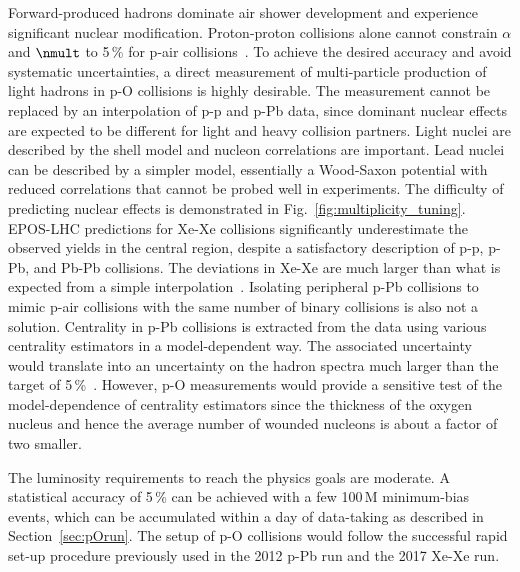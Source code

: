 \documentclass[../report.tex]{subfiles}
\begin{document}
Forward-produced hadrons dominate air shower development and experience significant nuclear modification\cite{Aaij:2017cqq,Acharya:2018qsh}. Proton-proton collisions alone cannot constrain $\alpha$ and $\nmult$ to 5\,\% for p-air collisions~\cite{dEnterria:2018kcz}. To achieve the desired accuracy and avoid systematic uncertainties, a direct measurement of multi-particle production of light hadrons in p-O collisions is highly desirable. The measurement cannot be replaced by an interpolation of p-p and p-Pb data, since dominant nuclear effects are expected to be different for light and heavy collision partners. Light nuclei are described by the shell model and nucleon correlations are important. Lead nuclei can be described by a simpler model, essentially a Wood-Saxon potential with reduced correlations that cannot be probed well in experiments.
The difficulty of predicting nuclear effects is demonstrated in Fig.~\ref{fig:multiplicity_tuning}. EPOS-LHC predictions for Xe-Xe collisions significantly underestimate the observed yields in the central region, despite a satisfactory description of p-p, p-Pb, and Pb-Pb collisions. The deviations in Xe-Xe are much larger than what is expected from a simple interpolation~\cite{Kim:2018ink}. Isolating peripheral p-Pb collisions to mimic p-air collisions with the same number of binary collisions is also not a solution. Centrality in p-Pb collisions is extracted from the data using various centrality estimators in a model-dependent way. The associated uncertainty would translate into an uncertainty on the hadron spectra much larger than the target of 5\,\%~\cite{Toia:2014wia}. However, p-O measurements would provide a sensitive test of the model-dependence of centrality estimators since the thickness of the oxygen nucleus and hence the average number of wounded nucleons is about a factor of two smaller.

 The luminosity requirements to reach the physics goals are moderate. A statistical accuracy of 5\,\% can be achieved with a few 100\,M minimum-bias events, which can be accumulated within a day of data-taking as described in Section~\ref{sec:pOrun}. The setup of p-O collisions would follow the successful rapid set-up procedure previously used in the 2012 p-Pb run and the 2017 Xe-Xe run.
\end{document}
